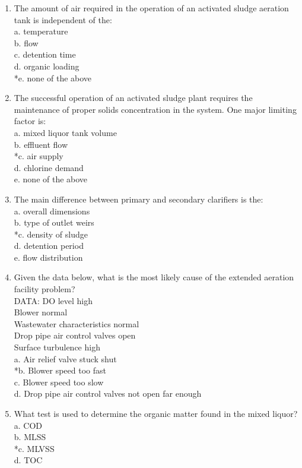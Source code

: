 \begin{enumerate}
\item The amount of air required in the operation of an activated sludge aeration tank is independent of the: \\
a. temperature \\
b. flow \\
c. detention time \\
d. organic loading \\
*e. none of the above \\

\item The successful operation of an activated sludge plant requires the maintenance of proper solids concentration in the system.  One major limiting factor is: \\
a. mixed liquor tank volume \\
b. effluent flow \\
*c. air supply \\
d. chlorine demand \\
e. none of the above \\

\item The main difference between primary and secondary clarifiers is the: \\
a. overall dimensions \\
b. type of outlet weirs \\
*c. density of sludge \\
d. detention period \\
e. flow distribution \\

\item Given the data below, what is the most likely cause of the extended aeration facility problem?\\
DATA: DO level high\\
Blower normal\\
Wastewater characteristics normal\\
Drop pipe air control valves open\\
Surface turbulence high \\
a. Air relief valve stuck shut \\
*b. Blower speed too fast \\
c. Blower speed too slow \\
d. Drop pipe air control valves not open far enough \\

\item What test is used to determine the organic matter found in the mixed liquor? \\
a. COD \\
b. MLSS \\
*c. MLVSS \\
d. TOC \\


\end{enumerate}
